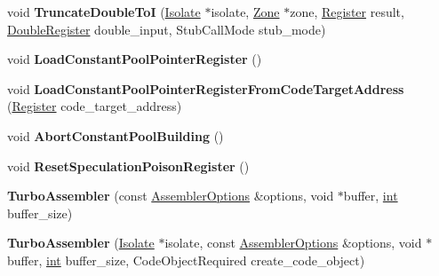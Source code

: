 \begin{DoxyCompactItemize}
\item 
\mbox{\label{classv8_1_1internal_1_1TurboAssembler_ad4a35e3c684e61cd09fdb105d9457529}} 
void {\bfseries Truncate\+Double\+ToI} (\mbox{\hyperlink{classv8_1_1internal_1_1Isolate}{Isolate}} $\ast$isolate, \mbox{\hyperlink{classv8_1_1internal_1_1Zone}{Zone}} $\ast$zone, \mbox{\hyperlink{classv8_1_1internal_1_1Register}{Register}} result, \mbox{\hyperlink{classv8_1_1internal_1_1DoubleRegister}{Double\+Register}} double\+\_\+input, Stub\+Call\+Mode stub\+\_\+mode)
\item 
\mbox{\label{classv8_1_1internal_1_1TurboAssembler_ace918885535d4145a4071c75c38738c0}} 
void {\bfseries Load\+Constant\+Pool\+Pointer\+Register} ()
\item 
\mbox{\label{classv8_1_1internal_1_1TurboAssembler_a03448c215766c35ae06bf8eae725abc5}} 
void {\bfseries Load\+Constant\+Pool\+Pointer\+Register\+From\+Code\+Target\+Address} (\mbox{\hyperlink{classv8_1_1internal_1_1Register}{Register}} code\+\_\+target\+\_\+address)
\item 
\mbox{\label{classv8_1_1internal_1_1TurboAssembler_ad42bd3d6231df9b510963ca3f79c5837}} 
void {\bfseries Abort\+Constant\+Pool\+Building} ()
\item 
\mbox{\label{classv8_1_1internal_1_1TurboAssembler_a282571b73c77ef466d68a106c557956d}} 
void {\bfseries Reset\+Speculation\+Poison\+Register} ()
\item 
\mbox{\label{classv8_1_1internal_1_1TurboAssembler_ac5a1cdee47961f289dbb095cc534ef95}} 
{\bfseries Turbo\+Assembler} (const \mbox{\hyperlink{structv8_1_1internal_1_1AssemblerOptions}{Assembler\+Options}} \&options, void $\ast$buffer, \mbox{\hyperlink{classint}{int}} buffer\+\_\+size)
\item 
\mbox{\label{classv8_1_1internal_1_1TurboAssembler_ac5d3c303e7abed78a6c1fe7f9834c045}} 
{\bfseries Turbo\+Assembler} (\mbox{\hyperlink{classv8_1_1internal_1_1Isolate}{Isolate}} $\ast$isolate, const \mbox{\hyperlink{structv8_1_1internal_1_1AssemblerOptions}{Assembler\+Options}} \&options, void $\ast$buffer, \mbox{\hyperlink{classint}{int}} buffer\+\_\+size, Code\+Object\+Required create\+\_\+code\+\_\+object)

\end{DoxyCompactItemize}
